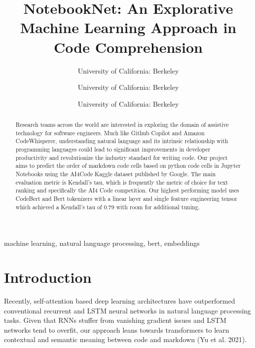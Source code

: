 \documentclass[conference]{IEEEtran}
\begin{document}
\title{NotebookNet: An Explorative Machine Learning Approach in Code Comprehension }

\author{
University of California: Berkeley
\and
{}
University of California: Berkeley
\and
{}
University of California: Berkeley}

\maketitle

\thispagestyle{firstpagefooter}

\begin{abstract}
Research teams across the world are interested in exploring the domain of assistive technology for software engineers. Much like Github Copilot and Amazon CodeWhisperer, understanding natural language and its intrinsic relationship with programming languages could lead to significant improvements in developer productivity and revolutionize the industry standard for writing code. Our project aims to predict the order of markdown code cells based on python code cells in Jupyter Notebooks using the AI4Code Kaggle dataset published by Google. The main evaluation metric is Kendall’s tau, which is frequently the metric of choice for text ranking and specifically the AI4 Code competition. Our highest performing model uses CodeBert and Bert tokenizers with a linear layer and single feature engineering tensor which achieved a Kendall’s tau of 0.79 with room for additional tuning.
\end{abstract}

\begin{IEEEkeywords}
machine learning, natural language processing, bert, embeddings
\end{IEEEkeywords}



\section{Introduction}
Recently, self-attention based deep learning architectures have outperformed conventional recurrent and LSTM neural networks in natural language processing tasks. Given that RNNs stuffer from vanishing gradient issues and LSTM networks tend to overfit, our approach leans towards transformers to learn contextual and semantic meaning between code and markdown (Yu et al. 2021).
\end{document}
